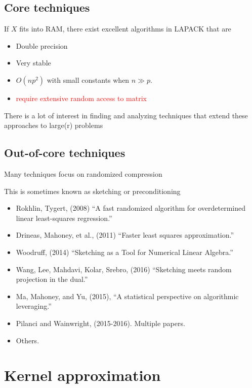 \documentclass[]{article}
\providecommand{\tightlist}{%
  \setlength{\itemsep}{0pt}\setlength{\parskip}{0pt}}
\renewcommand{\sout}[1]{\textcolor{red}{#1}}
\begin{document}
\hypertarget{core-techniques}{%
\subsection{Core techniques}\label{core-techniques}}

If \(X\) fits into RAM, there exist excellent algorithms in LAPACK that
are

\begin{itemize}
\tightlist
\item
  Double precision
\item
  Very stable
\item
  \(O(np^2)\) with small constants when \(n\gg p\).
\item
  \sout{require extensive random access to matrix}
\end{itemize}

There is a lot of interest in finding and analyzing techniques that
extend these approaches to large(r) problems

\hypertarget{out-of-core-techniques}{%
\subsection{Out-of-core techniques}\label{out-of-core-techniques}}

Many techniques focus on randomized compression

This is sometimes known as sketching or preconditioning

\begin{itemize}
\tightlist
\item
  Rokhlin, Tygert, (2008) ``A fast randomized algorithm for
  overdetermined linear least-squares regression.''
\item
  Drineas, Mahoney, et al., (2011) ``Faster least squares
  approximation.''
\item
  Woodruff, (2014) ``Sketching as a Tool for Numerical Linear Algebra.''
\item
  Wang, Lee, Mahdavi, Kolar, Srebro, (2016) ``Sketching meets random
  projection in the dual.''
\item
  Ma, Mahoney, and Yu, (2015), ``A statistical perspective on
  algorithmic leveraging.''
\item
  Pilanci and Wainwright, (2015-2016). Multiple papers.
\item
  Others.
\end{itemize}

\hypertarget{kernel-approximation}{%
\section{Kernel approximation}\label{kernel-approximation}}
\end{document}
